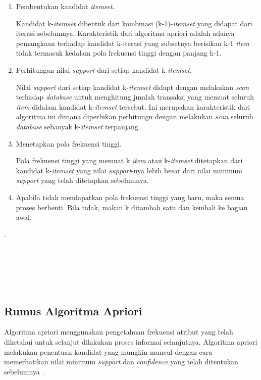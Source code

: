  \begin{enumerate}
\item Pembentukan kandidat \textit{itemset}.
\par Kandidat k-\textit{itemset} dibentuk dari kombinasi (k-1)-\textit{itemset} yang didapat dari iterasi sebelumnya. Karakteristik dari algoritma apriori adalah adanya pemangkaan terhadap kandidat k-iterasi yang subsetnya berisikan k-1 \textit{item} tidak termasuk kedalam pola frekuensi tinggi dengan panjang k-1.
\item Perhitungan nilai \textit{support} dari setiap kandidat k-\textit{itemset}.
\par Nilai \textit{support} dari setiap kandidat k-\textit{itemset} didapt dengan melakukan \textit{scan} terhadap \textit{database} untuk menghitung jumlah transaksi yang memuat seluruh \textit{item} didalam kandidat k-\textit{itemset} tersebut. Ini merupakan karakteristik dari algoritma ini dimana diperlukan perhitungn dengan melakukan \textit{scan} seluruh \textit{database} sebanyak k-\textit{itemset} terpanjang.
\item Menetapkan pola frekuensi tinggi.

\par 
Pola frekuensi tinggi yang memuat k \textit{item} atau k-\textit{itemset} ditetapkan dari kandidat k-\textit{itemset} yang nilai \textit{support}-nya lebih besar dari nilai minimum \textit{support} yang telah ditetapkan sebelumnya.
\item Apabila tidak mendapatkan pola frekuensi tinggi yang baru, maka semua proses berhenti. Bila tidak, makan k ditambah satu dan kembali ke bagian awal.
\end{enumerate}
.
\\
\\
\\
\\
\\
\\
\subsection{Rumus Algoritma Apriori}
\par Algoritma apriori menggunakan pengetahuan frekuensi atribut yang telah diketahui untuk selanjut dilakukan proses informai selanjutnya. Algoritma apriori melakukan penentuan kandidat yang mungkin muncul dengan cara memerhatikan nilai  minimum \textit{support} dan \textit{confidence} yang telah ditentukan sebelumnya \cite{yanto2015implementasi}.


